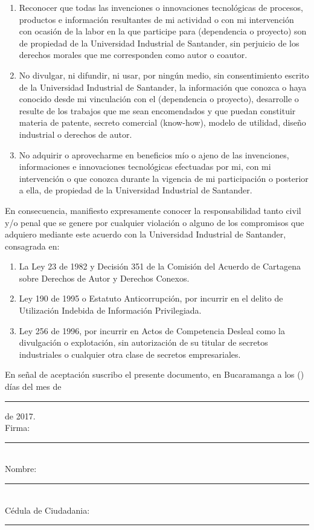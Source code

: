 \documentclass[12pt,letterpaper]{article}
\begin{document}
\begin{enumerate}
\item Reconocer que todas las invenciones o innovaciones tecnológicas de procesos, productos e información resultantes de mi actividad o con mi intervención con ocasión de la labor en la que participe para (dependencia o proyecto)  son de propiedad de la Universidad Industrial de Santander, sin perjuicio de los derechos morales que me corresponden como autor o coautor.

\item No divulgar, ni difundir, ni usar, por ningún medio, sin consentimiento escrito de la Universidad Industrial de Santander, la información que conozca o haya conocido desde mi vinculación con el (dependencia o proyecto), desarrolle o resulte de los trabajos que me sean encomendados y que puedan constituir materia de patente, secreto comercial (know-how), modelo de utilidad, diseño industrial o derechos de autor.

\item No adquirir o aprovecharme en beneficios mío o ajeno de las invenciones, informaciones e innovaciones tecnológicas efectuadas por mi, con mi intervención o que conozca durante la vigencia de mi participación o posterior a ella, de propiedad de la Universidad Industrial de Santander.
\end{enumerate}
En consecuencia, manifiesto expresamente conocer la responsabilidad tanto civil y/o penal que se genere por cualquier violación o alguno de los compromisos que adquiero mediante este acuerdo con la Universidad Industrial de Santander, consagrada en:

\begin{enumerate}
\item La Ley 23 de 1982 y Decisión 351 de la Comisión del Acuerdo de Cartagena sobre Derechos de Autor y Derechos Conexos.

\item Ley 190 de 1995 o Estatuto Anticorrupción, por incurrir en el delito de Utilización Indebida de Información Privilegiada.

\item Ley 256 de 1996, por incurrir en Actos de Competencia Desleal como la divulgación o explotación, sin autorización de su titular de secretos industriales o cualquier otra clase de secretos empresariales.
\end{enumerate}
En señal de aceptación suscribo el presente documento, en Bucaramanga a los  (\noindent{\rule{1cm}{0.4pt}}) días del mes de \noindent\rule{2cm}{0.4pt} de 2017.\\
Firma: \rule{5cm}{0.4pt}\\
Nombre: \rule{5cm}{0.4pt}\\
Cédula de Ciudadania: \rule{5cm}{0.4pt}\\
\end{document}
